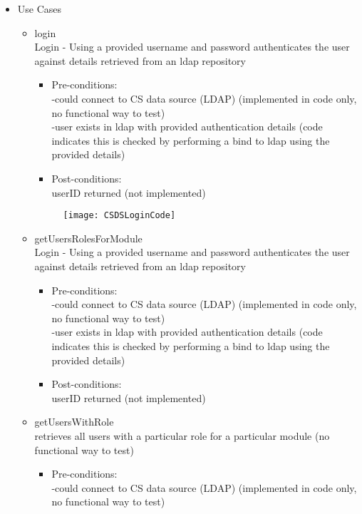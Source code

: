 \begin {itemize}
\item Use Cases
\begin {itemize}
\item {login}\\
Login - Using a provided username and password authenticates the user against details retrieved from an ldap repository
\begin {itemize}
\item Pre-conditions:\\
-could connect to CS data source (LDAP) (implemented in code only, no functional way to test)\\
        -user exists in ldap with provided authentication details (code indicates this is checked by performing a bind to ldap using the provided details)\\
\item Post-conditions:\\
userID returned (not implemented)  
\end {itemize}

\begin{figure}[h!]
  \centering
    \texttt{[image: CSDSLoginCode]} 
\end{figure}


\end {itemize}

\begin {itemize}
\item {getUsersRolesForModule}\\
Login - Using a provided username and password authenticates the user against details retrieved from an ldap repository\\
\begin {itemize}
\item Pre-conditions:\\
-could connect to CS data source (LDAP) (implemented in code only, no functional way to test)\\
        -user exists in ldap with provided authentication details (code indicates this is checked by performing a bind to ldap using the provided details)\\
\item Post-conditions:\\
userID returned (not implemented)  
\end {itemize}
\end {itemize}

\begin {itemize}
\item {getUsersWithRole}\\
retrieves all users with a particular role for a particular module (no functional way to test)
\begin {itemize}
\item Pre-conditions:\\
-could connect to CS data source (LDAP) (implemented in code only, no functional way to test)\\  
\end {itemize}


\end{itemize}
\end{itemize}
